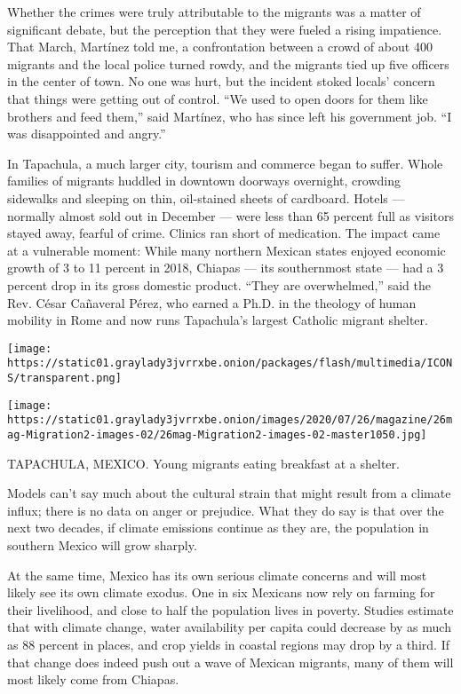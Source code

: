 Whether the crimes were truly attributable to the migrants was a matter
of significant debate, but the perception that they were fueled a rising
impatience. That March, Martínez told me, a confrontation between a
crowd of about 400 migrants and the local police turned rowdy, and the
migrants tied up five officers in the center of town. No one was hurt,
but the incident stoked locals' concern that things were getting out of
control. ``We used to open doors for them like brothers and feed them,''
said Martínez, who has since left his government job. ``I was
disappointed and angry.''

In Tapachula, a much larger city, tourism and commerce began to suffer.
Whole families of migrants huddled in downtown doorways overnight,
crowding sidewalks and sleeping on thin, oil-stained sheets of
cardboard. Hotels --- normally almost sold out in December --- were less
than 65 percent full as visitors stayed away, fearful of crime. Clinics
ran short of medication. The impact came at a vulnerable moment: While
many northern Mexican states enjoyed economic growth of 3 to 11 percent
in 2018, Chiapas --- its southernmost state --- had a 3 percent drop in
its gross domestic product. ``They are overwhelmed,'' said the Rev.
César Cañaveral Pérez, who earned a Ph.D. in the theology of human
mobility in Rome and now runs Tapachula's largest Catholic migrant
shelter.

\texttt{[image: https://static01.graylady3jvrrxbe.onion/packages/flash/multimedia/ICONS/transparent.png]}

\texttt{[image: https://static01.graylady3jvrrxbe.onion/images/2020/07/26/magazine/26mag-Migration2-images-02/26mag-Migration2-images-02-master1050.jpg]}

TAPACHULA, MEXICO. Young migrants eating breakfast at a shelter.

Models can't say much about the cultural strain that might result from a
climate influx; there is no data on anger or prejudice. What they do say
is that over the next two decades, if climate emissions continue as they
are, the population in southern Mexico will grow sharply.

At the same time, Mexico has its own serious climate concerns and will
most likely see its own climate exodus. One in six Mexicans now rely on
farming for their livelihood, and close to half the population lives in
poverty. Studies estimate that with climate change, water availability
per capita could decrease by as much as 88 percent in places, and crop
yields in coastal regions may drop by a third. If that change does
indeed push out a wave of Mexican migrants, many of them will most
likely come from Chiapas.

